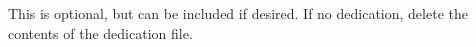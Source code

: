 \begin{dedication}
	This is optional, but can be included if desired.
	If no dedication, delete the contents of the dedication file.
\end{dedication}
